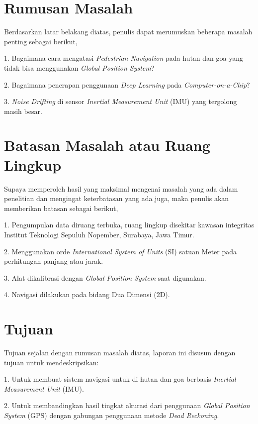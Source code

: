 \section{Rumusan Masalah}

Berdasarkan latar belakang diatas, penulis dapat merumuskan beberapa masalah penting sebagai berikut,

1. Bagaimana cara mengatasi \emph{Pedestrian Navigation} pada hutan dan goa yang tidak bisa menggunakan \emph{Global Position System}?

2. Bagaimana penerapan penggunaan \emph{Deep Learning} pada \emph{Computer-on-a-Chip}?

3. \emph{Noise Drifting} di sensor \emph{Inertial Measurement Unit} (IMU) yang tergolong masih besar.

\section{Batasan Masalah atau Ruang Lingkup}

Supaya memperoleh hasil yang maksimal mengenai masalah yang ada dalam penelitian dan mengingat keterbatasan yang ada juga,
maka penulis akan memberikan batasan sebagai berikut,

1. Pengumpulan data diruang terbuka, ruang lingkup disekitar kawasan integritas Institut Teknologi Sepuluh Nopember, Surabaya, Jawa Timur.

2. Menggunakan orde \emph{International System of Units} (SI) satuan Meter pada perhitungan panjang atau jarak.

3. Alat dikalibrasi dengan \emph{Global Position System} saat digunakan.

4. Navigasi dilakukan pada bidang Dua Dimensi (2D).

\section{Tujuan}

Tujuan sejalan dengan rumusan masalah diatas, laporan ini disusun dengan tujuan untuk mendeskripsikan:

1. Untuk membuat sistem navigasi untuk di hutan dan goa berbasis \emph{Inertial Measurement Unit} (IMU).

2. Untuk membandingkan hasil tingkat akurasi dari penggunaan \emph{Global Position System} (GPS) dengan 
gabungan penggunaan metode \emph{Dead Reckoning}.

